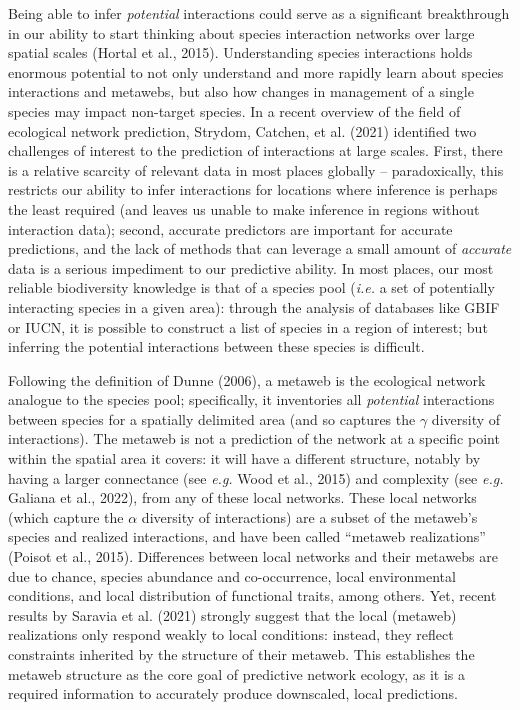 \documentclass[11pt]{article}
\begin{document}
Being able to infer \emph{potential} interactions could serve as a
significant breakthrough in our ability to start thinking about species
interaction networks over large spatial scales (Hortal et al., 2015).
Understanding species interactions holds enormous potential to not only
understand and more rapidly learn about species interactions and
metawebs, but also how changes in management of a single species may
impact non-target species. In a recent overview of the field of
ecological network prediction, Strydom, Catchen, et al. (2021)
identified two challenges of interest to the prediction of interactions
at large scales. First, there is a relative scarcity of relevant data in
most places globally -- paradoxically, this restricts our ability to
infer interactions for locations where inference is perhaps the least
required (and leaves us unable to make inference in regions without
interaction data); second, accurate predictors are important for
accurate predictions, and the lack of methods that can leverage a small
amount of \emph{accurate} data is a serious impediment to our predictive
ability. In most places, our most reliable biodiversity knowledge is
that of a species pool (\emph{i.e.} a set of potentially interacting
species in a given area): through the analysis of databases like GBIF or
IUCN, it is possible to construct a list of species in a region of
interest; but inferring the potential interactions between these species
is difficult.

Following the definition of Dunne (2006), a metaweb is the ecological
network analogue to the species pool; specifically, it inventories all
\emph{potential} interactions between species for a spatially delimited
area (and so captures the \(\gamma\) diversity of interactions). The
metaweb is not a prediction of the network at a specific point within
the spatial area it covers: it will have a different structure, notably
by having a larger connectance (see \emph{e.g.} Wood et al., 2015) and
complexity (see \emph{e.g.} Galiana et al., 2022), from any of these
local networks. These local networks (which capture the \(\alpha\)
diversity of interactions) are a subset of the metaweb's species and
realized interactions, and have been called ``metaweb realizations''
(Poisot et al., 2015). Differences between local networks and their
metawebs are due to chance, species abundance and co-occurrence, local
environmental conditions, and local distribution of functional traits,
among others. Yet, recent results by Saravia et al. (2021) strongly
suggest that the local (metaweb) realizations only respond weakly to
local conditions: instead, they reflect constraints inherited by the
structure of their metaweb. This establishes the metaweb structure as
the core goal of predictive network ecology, as it is a required
information to accurately produce downscaled, local predictions.
\end{document}

